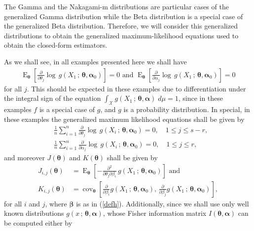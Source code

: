 \documentclass[lineno]{biometrika}
\newcommand{\bs}{\boldsymbol}
\newcommand{\on}{\operatorname}
\begin{document}
The Gamma and the Nakagami-m distributions are particular cases of the generalized Gamma distribution while the Beta distribution is a special case of the generalized Beta distribution. Therefore, we will consider this generalized distributions to obtain the generalized maximum-likelihood equations used to obtain the closed-form estimators. 

As we shall see, in all examples presented here we shall have
\begin{equation}\label{allex}
\begin{aligned}\on{E}_{\bs{\theta}}\left[\frac{\partial}{\partial \theta_j}  \log\, g(X_1\,;\,\bs{\theta},\bs{\alpha}_0)\right] = 0\mbox{ and }
\on{E}_{\bs{\theta}}\left[\frac{\partial}{\partial \alpha_j}  \log\, g(X_1\,;\,\bs{\theta},\bs{\alpha}_0)\right] = 0
\end{aligned}
\end{equation}
for all $j$. This should be expected in these examples due to differentiation under the integral sign of the equation $\int_{\mathcal{X}}  g(X_1\,;\,\bs{\theta},\bs{\alpha})\; d\mu =1$, since in these examples $f$ is a special case of $g$, and $g$ is a probability distribution. In special, in these examples the generalized maximum likelihood equations shall be given by
\begin{equation}\label{modified}
\begin{aligned}
&\frac{1}{n}\sum_{i=1}^n \frac{\partial}{\partial \theta_j}  \log\, g(X_i\,;\,\bs{\theta},\bs{\alpha}_0) = 0,\quad 1\leq j\leq s-r,\\ &\frac{1}{n}
\sum_{i=1}^n \frac{\partial}{\partial \alpha_j}  \log\, g(X_i\,;\,\bs{\theta},\bs{\alpha}_0)=0, \quad  1\leq j\leq r,
\end{aligned}
\end{equation}
and moreover  $J(\bs{\theta})$ and $K(\bs{\theta})$ shall be given by
 \begin{equation}\label{eqj}
 \begin{aligned}J_{i,j}(\bs{\theta})&=
 \on{E}_{\bs{\theta}} \left[-\frac{\partial^2}{\partial\theta_j\partial \beta_i}\, g(X_1\, ;\, \bs{\theta},\bs{\alpha}_0)\right]\mbox{ and}\\
 K_{i,j}(\bs{\theta}) &=  \on{cov}_{\bs{\theta}} \left[\frac{\partial}{\partial \beta_i} g(X_1\, ;\, \bs{\theta},\bs{\alpha}_0),\,  \frac{\partial}{\partial \beta_j} g(X_1\, ;\, \bs{\theta},\bs{\alpha}_0)\right],
 \end{aligned}
 \end{equation}
 for all $i$ and $j$, where $\bs{\beta}$ is as in (\ref{defh}). Additionally, since we shall use only well known distributions $g(x\,;\, \bs{\theta},\bs{\alpha})$, whose  Fisher information matrix $I(\bs{\theta},\bs{\alpha})$ can be computed either by
\end{document}
